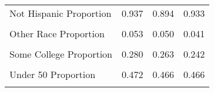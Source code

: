 \begin{table}[H]
\begin{tabular}[t]{lrrr}
Not Hispanic Proportion & 0.937 & 0.894 & 0.933\\
\cellcolor{gray!6}{Not Married Proportion} & \cellcolor{gray!6}{0.374} & \cellcolor{gray!6}{0.362} & \cellcolor{gray!6}{0.373}\\
Other Race Proportion & 0.053 & 0.050 & 0.041\\
\addlinespace
\cellcolor{gray!6}{Over 50 Proportion} & \cellcolor{gray!6}{0.355} & \cellcolor{gray!6}{0.349} & \cellcolor{gray!6}{0.360}\\
Some College Proportion & 0.280 & 0.263 & 0.242\\
\cellcolor{gray!6}{Under 30 Proportion} & \cellcolor{gray!6}{0.173} & \cellcolor{gray!6}{0.186} & \cellcolor{gray!6}{0.175}\\
Under 50 Proportion & 0.472 & 0.466 & 0.466\\
\cellcolor{gray!6}{White Proportion} & \cellcolor{gray!6}{0.837} & \cellcolor{gray!6}{0.826} & \cellcolor{gray!6}{0.813}\\
\bottomrule
\end{tabular}
\end{table}
